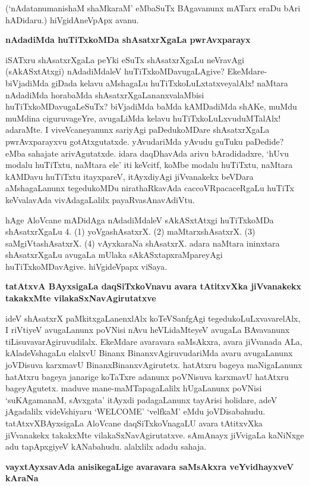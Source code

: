 (`nAdatanumanishaM shaMkaraM' eMbaSuTx BAgavanunx mATarx eraDu bAri hADidaru.) hiVgidAneVpApx avanu.

\noindent
{\bf\large{nAdadiMda huTiTxkoMDa shAsatxrXgaLa pwrAvxparayx}}

iSATxru shAsatxrXgaLa peYki eSuTx shAsatxrXgaLu neVravAgi (sAkASxtAtxgi) nAdadiMdaleV huTiTxkoMDavugaLAgive? EkeMdare- biVjadiMda giDada kelavu aMshagaLu huTiTxkoLuLxtatxveyalAlx! naMtara nAdadiMda horabaMda shAsatxrXgaLananxvalaMbisi huTiTxkoMDavugaLeSuTx? biVjadiMda baMda kAMDadiMda shAKe, muMdu muMdina ciguruvageYre, avugaLiMda kelavu huTiTxkoLuLxvuduMTalAlx! adaraMte. I viveVcaneyanunx sariyAgi paDedukoMDare shAsatxrXgaLa pwrAvxparayxvu gotAtxgutatxde. yAvudariMda yAvudu guTuku paDedide? eMba sahajate arivAgutatxde. idara daqDhavAda arivu bAradidadxre, `hUvu modalu huTiTxtu, naMtara ele' iti keVcitf, koMbe modalu huTiTxtu, naMtara kAMDavu huTiTxtu itayxpareV, itAyxdiyAgi jiVvanakekx beVDara aMshagaLanunx tegedukoMDu nirathaRkavAda caccoVRpacaceRgaLu huTiTx keVvalavAda vivAdagaLalilx payaRvasAnavAdiVtu.

hAge AloVcane mADidAga nAdadiMdaleV sAkASxtAtxgi huTiTxkoMDa shAsatxrXgaLu 4. (1) yoVgashAsatxrX. (2) maMtarxshAsatxrX. (3) saMgiVtashAsatxrX. (4) vAyxkaraNa shAsatxrX. adara naMtara ininxtara shAsatxrXgaLu avugaLa mUlaka sAkASxtapxraMpareyAgi huTiTxkoMDavAgive. hiVgideVpapx viSaya.

\noindent
{\bf\large{tatAtxvA BAyxsigaLa daqSiTxkoVnavu avara tAtitxvXka jiVvanakekx takakxMte vilakaSxNavAgirutatxve}}\label{page175}

ideV shAsatxrX paMkitxgaLanenxlAlx koTeVSanfgAgi tegedukoLuLxvavarelAlx, I riVtiyeV avugaLanunx poVNisi nAvu heVLidaMteyeV avugaLa BAvavanunx tiLisuvavarAgiruvudilalx. EkeMdare avaravara saMsAkxra, avara jiVvanada ALa, kAladeVshagaLu elalxvU Binanx BinanxvAgiruvudariMda avaru avugaLanunx joVDisuva karxmavU BinanxBinanxvAgirutetx. hatAtxru bageya maNigaLanunx hatAtxru bageya janarige koTaTxre adanunx poVNisuva karxmavU hatAtxru bageyAgutetx. maduve mane-maMTapagaLalilx hUgaLanunx poVNisi `suKAgamanaM, sAvxgata' itAyxdi padagaLanunx tayArisi holidare, adeV jAgadalilx videVshiyaru {\rm `WELCOME'} `velfkaM' eMdu joVDisabahudu. tatAtxvXBAyxsigaLa AloVcane daqSiTxkoVnagaLU avara tAtitxvXka jiVvanakekx takakxMte vilakaSxNavAgirutatxve. sAmAnayx jiVvigaLa kaNiNxge adu tapApxgiyeV kANabahudu. alalxlilx adadu sahaja.

\noindent
{\bf\large{vayxtAyxsavAda anisikegaLige avaravara saMsAkxra veYvidhayxveV kAraNa}}\label{page176}

